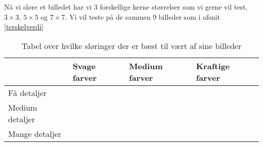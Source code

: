 Nå vi sløre et billedet har vi 3 forskellige kerne størrelser som vi
gerne vil test, $3 \times 3$, $5 \times 5$ og $7 \times 7$. Vi vil teste på de sammen 9 billeder som i afsnit \ref{terskelverdi} 


\begin{table}[!h]
    \centering
    \begin{tabular}{| l | l | l | l |} \hline
                            & Svage farver 	& Medium farver & Kraftige farver \\ \hline
        Få detaljer 		&        		&        		& \\ \hline
        Medium detaljer 	& 		        &       		& \\ \hline
        Mange detaljer		&       		&       		& \\ \hline
    \end{tabular}
    \caption{Tabel over hvilke sløringer der er bæst til vært af sine billeder}
    \label{sloringTabel}
\end{table} 
